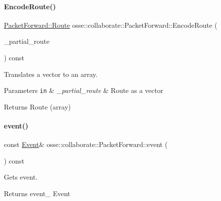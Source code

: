\paragraph{\texorpdfstring{Encode\+Route()}{EncodeRoute()}}
{\footnotesize\ttfamily \hyperlink{classosse_1_1collaborate_1_1_packet_forward_a5b42a7c3605c5a6c7e0880599b213240}{Packet\+Forward\+::\+Route} osse\+::collaborate\+::\+Packet\+Forward\+::\+Encode\+Route (\begin{DoxyParamCaption}\item[{const \hyperlink{classosse_1_1collaborate_1_1_packet_forward_a4627beb1294e822a7eec6038969a5da0}{Partial\+Route} \&}]{\+\_\+partial\+\_\+route }\end{DoxyParamCaption}) const\hspace{0.3cm}{\ttfamily [private]}}



Translates a vector to an array. 


\begin{DoxyParams}[1]{Parameters}
\mbox{\tt in}  & {\em \+\_\+partial\+\_\+route} & Route as a vector \\
\hline
\end{DoxyParams}
\begin{DoxyReturn}{Returns}
Route (array) 
\end{DoxyReturn}
\mbox{\label{classosse_1_1collaborate_1_1_packet_forward_a6807359ebbff9386a42e8310493cccc3}} 
\paragraph{\texorpdfstring{event()}{event()}}
{\footnotesize\ttfamily const \hyperlink{classosse_1_1collaborate_1_1_packet_forward_a66c37a806c4b486cb1af64409865fa4b}{Event}\& osse\+::collaborate\+::\+Packet\+Forward\+::event (\begin{DoxyParamCaption}{ }\end{DoxyParamCaption}) const\hspace{0.3cm}{\ttfamily [inline]}}



Gets event. 

\begin{DoxyReturn}{Returns}
event\+\_\+ Event 
\end{DoxyReturn}
\mbox{\label{classosse_1_1collaborate_1_1_packet_forward_ada8a2b432af1e7e4dc09bcf056e45273}} 
